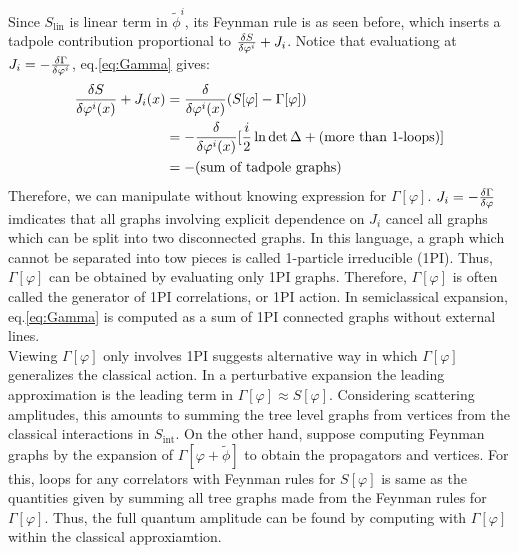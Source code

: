 \indent Since $S_{\text{lin}}$ is linear term in $\tilde{\phi}^{i}$, its Feynman rule is as seen before, which inserts a tadpole contribution proportional to $\fdv{S}{\varphi ^{i}} + J_{i}$. Notice that evaluationg at $J_{i} = -\fdv{\Gamma}{\varphi ^{i}}$, eq.\ref{eq:Gamma} gives:
\begin{align}
    \begin{split}
    \fdv{S}{\varphi^{i}(x)} + J_{i}(x) &= \fdv{\varphi^{i}(x)} (S[\varphi] - \Gamma[\varphi])\\
    &= - \fdv{\varphi^{i}(x)} [\frac{i}{2} \ln \det \Delta + (\text{more than 1-loops})] \\
    & = -(\text{sum of tadpole graphs})
    \end{split}
\end{align}
Therefore, we can manipulate without knowing expression for $\Gamma[\varphi]$. $J_{i} =-\fdv{\Gamma}{\varphi}$ imdicates that all graphs involving explicit dependence on $J_{i}$ cancel all graphs which can be split into two disconnected graphs. In this language, a graph which cannot be separated into tow pieces is called 1-particle irreducible (1PI). Thus, $\Gamma[\varphi]$ can be obtained by evaluating only 1PI graphs. Therefore, $\Gamma[\varphi]$ is often called the generator of 1PI correlations, or 1PI action. In semiclassical expansion, eq.\ref{eq:Gamma} is computed as a sum of 1PI connected graphs without external lines. \\
\indent Viewing $\Gamma[\varphi]$ only involves 1PI suggests alternative way in which $\Gamma[\varphi]$ generalizes the classical action. In a perturbative expansion the leading approximation is the leading term in $\Gamma[\varphi] \approx S[\varphi]$. Considering scattering amplitudes, this amounts to summing the tree level graphs from vertices from the classical interactions in $S_{\text{int}}$. On the other hand, suppose computing Feynman graphs by the expansion of $\Gamma[\varphi + \tilde{\phi}]$ to obtain the propagators and vertices. For this, loops for any correlators with Feynman rules for $S[\varphi]$ is same as the quantities given by summing all tree graphs made from the Feynman rules for $\Gamma[\varphi]$. Thus, the full quantum amplitude can be found by computing with $\Gamma[\varphi]$ within the classical approxiamtion. 

